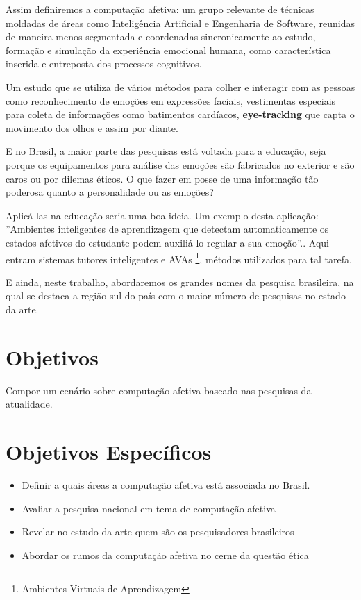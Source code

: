 \documentclass[
    12pt,                   %
    openright,              %
    oneside,                %
    a4paper,                %
    sumario=tradicional,    %
    english,                %
    brazil,                 %
    ]{abntex2}
\begin{document}
Assim definiremos a computação afetiva: um grupo relevante de técnicas moldadas de áreas como Inteligência Artificial e Engenharia de Software, reunidas de maneira menos segmentada e coordenadas sincronicamente ao estudo, formação e simulação da experiência emocional humana, como característica inserida e entreposta dos processos cognitivos.\cite{pontarolo2003diferentes} 

Um estudo que se utiliza de vários métodos para colher e interagir com as pessoas como reconhecimento de emoções em expressões faciais, vestimentas especiais para coleta de informações como batimentos cardíacos, \textbf{eye-tracking} que capta o movimento dos olhos e assim por diante.

E no Brasil, a maior parte das pesquisas está voltada para a educação, seja porque os equipamentos para análise das emoções são fabricados no exterior e são caros ou por dilemas éticos. O que fazer em posse de uma informação tão poderosa quanto a personalidade ou as emoções?

Aplicá-las na educação seria uma boa ideia. Um exemplo desta aplicação: ''Ambientes inteligentes de aprendizagem que detectam automaticamente os estados afetivos do estudante podem auxiliá-lo regular a sua emoção''.\cite{jaques2012computaccao}. Aqui entram sistemas tutores inteligentes e AVAs \footnote{Ambientes Virtuais de Aprendizagem}, métodos utilizados para tal tarefa.

E ainda, neste trabalho, abordaremos os grandes nomes da pesquisa brasileira, na qual se destaca a região sul do país com o maior número de pesquisas no estado da arte.

\newpage
\section{Objetivos}\label{sec:objetivos}
Compor um cenário sobre computação afetiva baseado nas pesquisas da atualidade.
\section{Objetivos Específicos}\label{sec:ObjetivosEspec}
\begin{itemize}
  \item Definir a quais áreas a computação afetiva está associada no Brasil.
  \item Avaliar a pesquisa nacional em tema de computação afetiva
  \item Revelar no estudo da arte quem são os pesquisadores brasileiros
  \item Abordar os rumos da computação afetiva no cerne da questão ética
  
\end{itemize}  
\end{document}
